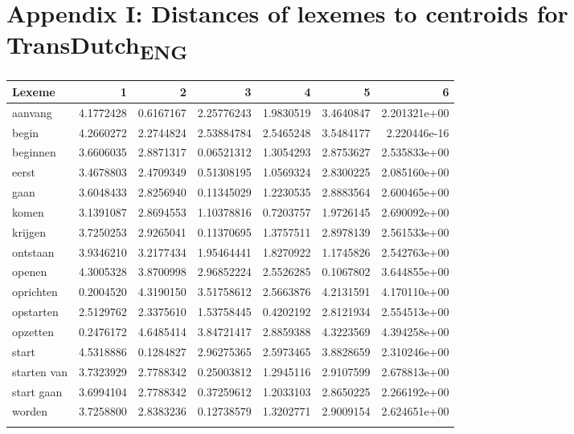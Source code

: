 \section*{Appendix I: Distances of lexemes to centroids for TransDutch\textsubscript{ENG}}
\begin{tabularx}{\textwidth}{Xrrrrrr}
\lsptoprule
Lexeme        & 1         & 2         & 3          & 4         & 5         & 6            \\ \midrule
aanvang       & 4.1772428 & 0.6167167 & 2.25776243 & 1.9830519 & 3.4640847 & 2.201321e+00 \\
begin         & 4.2660272 & 2.2744824 & 2.53884784 & 2.5465248 & 3.5484177 & 2.220446e-16 \\          
beginnen      & 3.6606035 & 2.8871317 & 0.06521312 & 1.3054293 & 2.8753627 & 2.535833e+00 \\       
eerst         & 3.4678803 & 2.4709349 & 0.51308195 & 1.0569324 & 2.8300225 & 2.085160e+00 \\      
gaan          & 3.6048433 & 2.8256940 & 0.11345029 & 1.2230535 & 2.8883564 & 2.600465e+00 \\
komen         & 3.1391087 & 2.8694553 & 1.10378816 & 0.7203757 & 1.9726145 & 2.690092e+00 \\      
krijgen       & 3.7250253 & 2.9265041 & 0.11370695 & 1.3757511 & 2.8978139 & 2.561533e+00 \\  
ontstaan      & 3.9346210 & 3.2177434 & 1.95464441 & 1.8270922 & 1.1745826 & 2.542763e+00 \\      
openen        & 4.3005328 & 3.8700998 & 2.96852224 & 2.5526285 & 0.1067802 & 3.644855e+00 \\   
oprichten     & 0.2004520 & 4.3190150 & 3.51758612 & 2.5663876 & 4.2131591 & 4.170110e+00 \\
opstarten     & 2.5129762 & 2.3375610 & 1.53758445 & 0.4202192 & 2.8121934 & 2.554513e+00 \\  
opzetten      & 0.2476172 & 4.6485414 & 3.84721417 & 2.8859388 & 4.3223569 & 4.394258e+00 \\       
start         & 4.5318886 & 0.1284827 & 2.96275365 & 2.5973465 & 3.8828659 & 2.310246e+00 \\ 
starten van   & 3.7323929 & 2.7788342 & 0.25003812 & 1.2945116 & 2.9107599 & 2.678813e+00 \\
start gaan    & 3.6994104 & 2.7788342 & 0.37259612 & 1.2033103 & 2.8650225 & 2.266192e+00 \\
worden        & 3.7258800 & 2.8383236 & 0.12738579 & 1.3202771 & 2.9009154 & 2.624651e+00 \\
\lspbottomrule
\end{tabularx}

